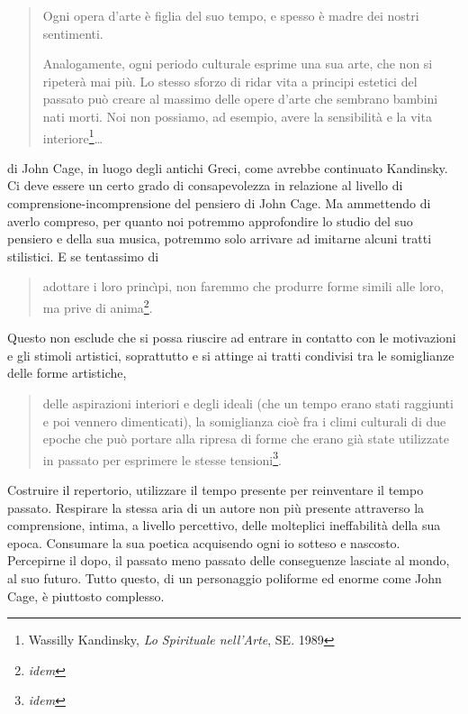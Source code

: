 
\begin{quote}
	Ogni opera d'arte \`e figlia del suo tempo, e spesso \`e madre dei nostri
	sentimenti.

	Analogamente, ogni periodo culturale esprime una sua arte, che non si ripeter\`a mai pi\`u.
	Lo stesso sforzo di ridar vita a principi estetici del passato pu\`o creare al massimo delle opere d'arte che sembrano bambini nati morti.
	Noi non possiamo, ad esempio, avere la sensibilit\`a e la vita interiore\footnote{Wassilly Kandinsky, \emph{Lo Spirituale nell'Arte}, SE. 1989}\ldots
\end{quote}

di John Cage, in luogo degli antichi Greci, come avrebbe continuato Kandinsky.
Ci deve essere un certo grado di consapevolezza in relazione al livello di
comprensione-incomprensione del pensiero di John Cage. Ma ammettendo di
averlo compreso, per quanto noi potremmo approfondire lo studio del suo
pensiero e della sua musica, potremmo solo arrivare ad imitarne alcuni tratti
stilistici. E se tentassimo di

\begin{quote}
	adottare i loro princ\`{\i}pi, non faremmo che produrre forme simili alle loro, ma prive di anima\footnote{\emph{idem}}.
\end{quote}

Questo non esclude che si possa riuscire ad entrare in contatto con le
motivazioni e gli stimoli artistici, soprattutto
e si attinge ai tratti
condivisi tra le somiglianze delle forme artistiche,

\begin{quote}
	delle aspirazioni interiori e degli ideali (che un tempo erano stati raggiunti
	e poi vennero dimenticati), la somiglianza cio\`e fra i climi culturali di due
	epoche che pu\`o portare alla ripresa di forme che erano gi\`a state utilizzate in
	passato per esprimere le stesse tensioni\footnote{\emph{idem}}.
\end{quote}

Costruire il repertorio, utilizzare il tempo presente per reinventare il tempo passato.
Respirare la stessa aria di un autore non pi\`u presente attraverso la comprensione, intima,
a livello percettivo, delle molteplici ineffabilit\`a della sua epoca.
Consumare la sua poetica acquisendo ogni io sotteso e nascosto. Percepirne il dopo,
il passato meno passato delle conseguenze lasciate al mondo, al suo futuro.
Tutto questo, di un personaggio poliforme ed enorme come John Cage, \`e piuttosto complesso.

